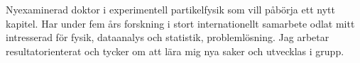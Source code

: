 

\begin{cvparagraph}

Nyexaminerad doktor i experimentell partikelfysik som vill påbörja ett nytt kapitel. %
Har under fem års forskning i stort internationellt samarbete odlat mitt intresserad för fysik, dataanalys och statistik, problemlösning. 
Jag arbetar resultatorienterat och tycker om att lära mig nya saker och utvecklas i grupp. %
\end{cvparagraph}